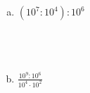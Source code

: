 \documentclass[a4paper,14pt]{article}
\begin{document}
\begin{multicols}{2}
\begin{enumerate}
\begin{enumerate}[a)]
				\item $(10^7 : 10^4) : 10^6$ \\\\\\\\
				\item $\frac{10^9 : 10^6}{10^4 \cdot 10^2}$ \\\\\\\\
			\end{enumerate}
		\end{enumerate}
		 $~$ \\ $~$ \\ $~$ \\ $~$ \\ $~$ \\ $~$ \\ $~$ \\ $~$ \\ $~$ \\ $~$ \\ $~$ \\ $~$ \\ $~$ \\ $~$ \\ $~$ \\ $~$ \\ $~$ \\ $~$ \\ $~$ \\ $~$ \\ $~$ \\ $~$ \\ $~$ \\ $~$ \\
	\end{multicols}
\end{document}
